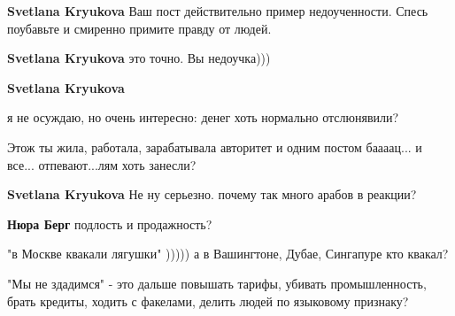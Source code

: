 \begin{itemize}
\begin{itemize}
 
\textbf{Svetlana Kryukova} Ваш пост действительно пример недоученности. Спесь поубавьте и смиренно примите правду от людей.

 
\textbf{Svetlana Kryukova} это точно. Вы недоучка)))

 
\textbf{Svetlana Kryukova} 

я не осуждаю, но очень интересно: денег хоть нормально отслюнявили?

Этож ты жила, работала, зарабатывала авторитет и одним постом баааац... и все...
отпевают...лям хоть занесли?

 
\textbf{Svetlana Kryukova} Не ну серьезно. почему так много арабов в реакции?

 
\textbf{Нюра Берг} подлость и продажность?

 

"в Москве квакали лягушки" ))))) а в Вашингтоне, Дубае, Сингапуре кто квакал?

"Мы не здадимся" - это дальше повышать тарифы, убивать промышленность, брать
кредиты, ходить с факелами, делить людей по языковому признаку?


\end{itemize}
\end{itemize}
